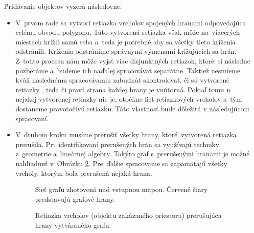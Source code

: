 Pridávanie objektov vyzerá následovne:

\begin{itemize}
    \item V~prvom rade sa vytvorí retiazka vrcholov spojených hranami odpovedajúca celému obvodu polygonu. Táto vytvorená retiazka však môže na~viacerých miestach krížiť samú seba a~teda je potrebné aby sa všetky tieto kríženia odstránili. Kríženia odstránime správnymi výmenami križujúcich sa hrán. Z~tohto procesu nám môže vyjsť viac disjunktných retiazok, ktoré~si následne pozberáme a~budeme ich naďalej spracovávať separátne. Taktiež nesmieme kvôli následnému spracovávaniu zabudnúť skontrolovať, či sú vytvorené retiazky , teda či pravá strana každej hrany je vnútorná. Pokiaľ tomu u nejakej vytvorenej retiazky nie je, otočíme list retiazkových vrcholov a~tým dostaneme pravotočivú retiazku. Táto vlastnosť bude dôležitá v následujúcom spracovaní.
    \item V~druhom kroku musíme prerušiť všetky hrany, ktoré~vytvorená retiazka prerušila. Pri~identifikovaní prerušených hrán sa využívajú techniky z~geometrie a~lineárnej algebry. Takýto graf s~prerušenými hranami je možné nahliadnuť v~Obrázku \ref{obr21:cut_edges_by_polygon_chain}. Pre~ďalšie spracovanie sa zapamätajú všetky vrcholy, ktorým bola prerušená nejaká hrana.

\begin{figure}[p]\centering
{}
\caption{Sieť grafu zhotovená nad vstupnou mapou. Červené čiary predstavujú grafové hrany.} 
\label{obr20:just_net}
\end{figure}

\begin{figure}[p]\centering
{}
\caption{Retiazka vrcholov (objektu zakázaného priestoru) prerušujúca hrany vytváraného grafu. } 
\label{obr21:cut_edges_by_polygon_chain}
\end{figure}


\end{itemize}
